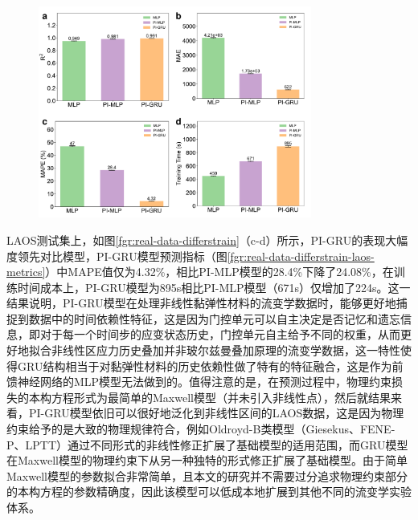 \begin{figure}
  \centering
  \includegraphics[width=0.8\textwidth]{Fig/real-data-differstrain-laos-metrics.pdf} %
\end{figure}
LAOS测试集上，如图\ref{fgr:real-data-differstrain}（c-d）所示，PI-GRU的表现大幅度领先对比模型，PI-GRU模型预测指标（图\ref{fgr:real-data-differstrain-laos-metrics}）中MAPE值仅为4.32\%，相比PI-MLP模型的28.4\%下降了24.08\%，在训练时间成本上，PI-GRU模型为895s相比PI-MLP模型（671s）仅增加了224s。这一结果说明，PI-GRU模型在处理非线性黏弹性材料的流变学数据时，能够更好地捕捉到数据中的时间依赖性特征，这是因为门控单元可以自主决定是否记忆和遗忘信息，即对于每一个时间步的应变状态历史，门控单元自主给予不同的权重，从而更好地拟合非线性区应力历史叠加并非玻尔兹曼叠加原理的流变学数据，这一特性使得GRU结构相当于对黏弹性材料的历史依赖性做了特有的特征融合，这是作为前馈神经网络的MLP模型无法做到的。值得注意的是，在预测过程中，物理约束损失的本构方程形式为最简单的Maxwell模型（并未引入非线性点），然后就结果来看，PI-GRU模型依旧可以很好地泛化到非线性区间的LAOS数据，这是因为物理约束给予的是大致的物理规律符合，例如Oldroyd-B类模型（Giesekus、FENE-P、​LPTT）通过不同形式的非线性修正扩展了基础模型的适用范围，而GRU模型在Maxwell模型的物理约束下从另一种独特的形式修正扩展了基础模型。由于简单Maxwell模型的参数拟合非常简单，且本文的研究并不需要过分追求物理约束部分的本构方程的参数精确度，因此该模型可以低成本地扩展到其他不同的流变学实验体系。



